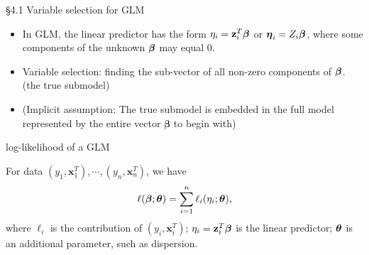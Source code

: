 \documentclass{beamer}
\begin{document}
\begin{frame}{\S4.1 Variable selection for GLM }
\begin{itemize}
\item
In GLM, the linear predictor has the form 
$\eta_i=\textbf{z}_i^T\mbox{\boldmath $\beta$}$ or $\mbox{\boldmath $\eta$}_i=Z_i\mbox{\boldmath $\beta$}$,
where some  components of the  unknown $\mbox{\boldmath $\beta$}$ may equal 0.
\item
Variable selection: finding the sub-vector of all non-zero components
of $\mbox{\boldmath $\beta$}$. (the true submodel)

\item (Implicit assumption: The true submodel is embedded in the full model represented by the entire vector ${\boldsymbol \beta}$ to begin with)
\end{itemize}
\end{frame}

\begin{frame} {log-likelihood of a GLM}

For data $(y_1, \textbf{x}_1^T), \cdots, (y_n, \textbf{x}_n^T)$, we have
\[
 \ell(\mbox{\boldmath $\beta$}; \mbox{\boldmath $\theta$})=\sum_{i=1}^n\ell_i(\eta_i;
\mbox{\boldmath $\theta$}), \] 
where $\ell_i$ is the 
contribution of $(y_i, \textbf{x}_i^T)$; $\eta_i=\textbf{z}_i^T\mbox{\boldmath $\beta$}$ is the linear
predictor; $\mbox{\boldmath $\theta$}$ is  an additional  parameter, such as dispersion.

\end{frame}
\end{document}
